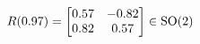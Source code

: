 \documentclass[preview]{standalone}
\begin{document}
\begin{align*}
\special{dvisvgm:raw <g id='unique000'>}R(0.97) = \begin{bmatrix} 0.57 & -0.82 \\ 0.82 & 0.57 \end{bmatrix} \in \text{SO}(2)\special{dvisvgm:raw </g>}
\end{align*}
\end{document}
